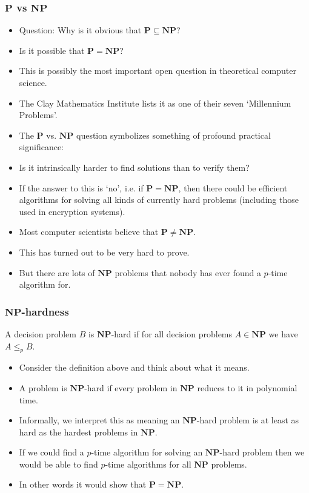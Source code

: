 \documentclass[handout]{beamer}
\newcommand{\Po}{\mathbf{P}}
\newcommand{\NP}{\mathbf{NP}}
\begin{document}
\begin{frame}
\frametitle{$\Po$ vs $\NP$}
\begin{itemize}
\item Question: Why is it obvious that $\Po\subseteq \NP$?
\item Is it possible that $\Po=\NP$? 
\item This is possibly the most important open question in theoretical computer science. 
\item The Clay Mathematics Institute lists it as one of their seven `Millennium Problems'. 
\item The $\Po$ vs. $\NP$ question symbolizes something of profound practical significance: 
\item Is it intrinsically harder to find solutions than to verify them? 
\item If the answer to this is `no', i.e. if $\Po=\NP$, then there could be efficient algorithms for solving all kinds of currently hard problems (including those used in encryption systems).
\item Most computer scientists believe that $\Po\neq\NP$. 
\item This has turned out to be very hard to prove. 
\item But there are lots of $\NP$ problems that nobody has ever found a $p$-time algorithm for.  
\end{itemize} 
\end{frame}

\begin{frame}
\frametitle{$\NP$-hardness}
\begin{definition}[$\NP$-hard]
A decision problem $B$ is $\NP$-hard if for all decision problems $A\in \NP$ we have $A\leq_p B$. 
\end{definition}
\begin{itemize}
\item Consider the definition above and think about what it means. 
\item A problem is $\NP$-hard if every problem in $\NP$ reduces to it in polynomial time. 
\item Informally, we interpret this as meaning an $\NP$-hard problem is at least as hard as the hardest problems in $\NP$. 
\item If we could find a $p$-time algorithm for solving an $\NP$-hard problem then we would be able to find $p$-time algorithms for all $\NP$ problems. 
\item In other words it would show that $\Po=\NP$.  
\end{itemize} 
\end{frame}
\end{document}
